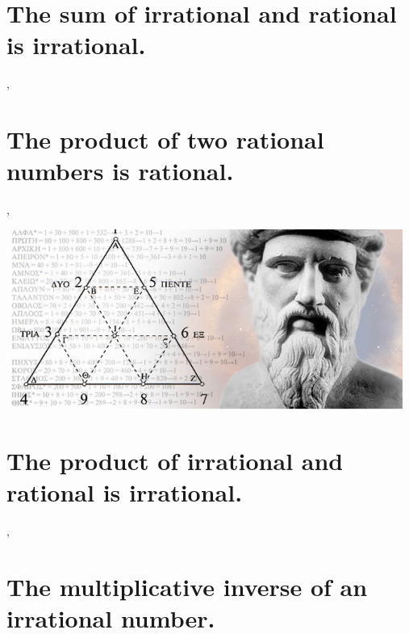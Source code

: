 \documentclass[preview]{standalone}
\begin{document}
\section{The sum of irrational and rational is irrational.}

\sep


\section{The product of two rational numbers is rational.}

\sep
\begin{center}
    \vspace{2\baselineskip}
    \includegraphics[width=13cm]{../resources/jpg/1.6.introduction.to.proofs/pythagoras.png}
\end{center}
\pagebreak


\section{The product of irrational and rational is irrational.}

\sep
\vspace{0.1\baselineskip}


\section{The multiplicative inverse of an irrational number.}

\pagebreak
\end{document}

